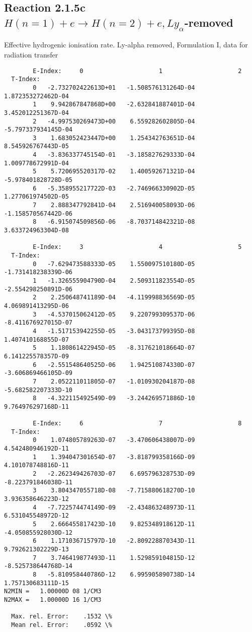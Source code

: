 \documentclass[12pt,dvipdfmx]{article}
\begin{document}
\subsection{
Reaction 2.1.5c  $H(n=1) + e \rightarrow H(n=2) + e, Ly_\alpha$-removed}


   Effective hydrogenic ionisation rate.
   Ly-alpha removed, Formulation I, data for radiation transfer

\begin{small}\begin{verbatim}
        E-Index:     0                     1                     2
  T-Index:
        0   -2.732702422613D+01   -1.508576131264D-04    1.872353272462D-04
        1    9.942867847868D+00   -2.632841887401D-04    3.452012251367D-04
        2   -4.997530269473D+00    6.559282602805D-04   -5.797337934145D-04
        3    1.683052423447D+00    1.254342763651D-04    8.545926767443D-05
        4   -3.836337745154D-01   -3.185827629333D-04    1.009778672991D-04
        5    5.720695520317D-02    1.400592671321D-04   -5.978401828728D-05
        6   -5.358955217722D-03   -2.746966330902D-05    1.277061974502D-05
        7    2.888347792841D-04    2.516940058093D-06   -1.158570567442D-06
        8   -6.915074509856D-06   -8.703714842321D-08    3.633724963304D-08

        E-Index:     3                     4                     5
  T-Index:
        0   -7.629473588333D-05    1.550097510180D-05   -1.731418238339D-06
        1   -1.326555904790D-04    2.509311823554D-05   -2.554298250891D-06
        2    2.250648741189D-04   -4.119998836569D-05    4.069891413295D-06
        3   -4.537015062412D-05    9.220799309537D-06   -8.411676927015D-07
        4   -1.517153942255D-05   -3.043173799395D-08    1.407410168855D-07
        5    1.180861422945D-05   -8.317621018664D-07    6.141225578357D-09
        6   -2.551548640525D-06    1.942510874330D-07   -3.606869466105D-09
        7    2.052211011805D-07   -1.010930204187D-08   -5.682582207333D-10
        8   -4.322115492549D-09   -3.244269571886D-10    9.764976297168D-11

        E-Index:     6                     7                     8
  T-Index:
        0    1.074805789263D-07   -3.470606438007D-09    4.542480946192D-11
        1    1.394047301654D-07   -3.818799358166D-09    4.101078748816D-11
        2   -2.262349426703D-07    6.695796328753D-09   -8.223791846038D-11
        3    3.804347055718D-08   -7.715880618270D-10    3.936358646223D-12
        4   -7.722574474149D-09   -2.434863248973D-11    6.531045548972D-12
        5    2.666455817423D-10    9.825348918612D-11   -4.050855928030D-12
        6    1.171036715797D-10   -2.809228870343D-11    9.792621302229D-13
        7    3.746419877493D-11    1.529859104815D-12   -8.525738644768D-14
        8   -5.810958440786D-12    6.995905890738D-14    1.757130683111D-15
N2MIN =   1.00000D 08 1/CM3
N2MAX =   1.00000D 16 1/CM3

  Max. rel. Error:    .1532 \%
  Mean rel. Error:    .0592 \%


\end{verbatim}\end{small}
\end{document}
